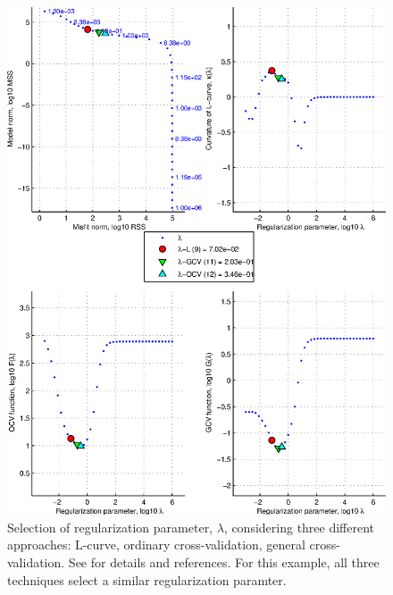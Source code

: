 \documentclass[11pt,titlepage,fleqn]{article}
\begin{document}
\begin{figure}
\includegraphics[width=16cm]{fig1D_4.eps}
\caption[]
{{
Selection of regularization parameter, $\lambda$, considering three different approaches: L-curve, ordinary cross-validation, general cross-validation. See \citet{Tape2009gps} for details and references. For this example, all three techniques select a similar regularization paramter.
\label{fig:fig1D_4}
}}
\end{figure}
\end{document}
